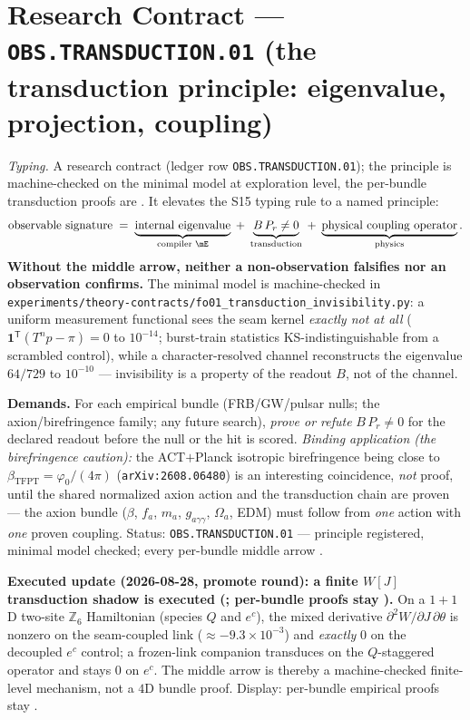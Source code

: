 \section*{Research Contract --- \texttt{OBS.TRANSDUCTION.01} (the transduction principle: eigenvalue, projection, coupling)}
\noindent\emph{Typing.} A research contract (ledger row \texttt{OBS.TRANSDUCTION.01}); the
principle is machine-checked on the minimal model at exploration level, the per-bundle
transduction proofs are \mO.  It elevates the S15 typing rule to a named principle:
\[
  \text{observable signature}
  \;=\;
  \underbrace{\text{internal eigenvalue}}_{\text{compiler \mE}}
  \;+\;
  \underbrace{B\,P_r\neq0}_{\text{transduction}}
  \;+\;
  \underbrace{\text{physical coupling operator}}_{\text{physics}} .
\]
\textbf{Without the middle arrow, neither a non-observation falsifies nor an observation
confirms.}  The minimal model is machine-checked in
\texttt{experiments/\allowbreak theory-contracts/\allowbreak fo01\_transduction\_invisibility.py}: a uniform measurement
functional sees the seam kernel \emph{exactly not at all} ($\mathbf1^{\mathsf T}(T^np-\pi)=0$ to
$10^{-14}$; burst-train statistics KS-indistinguishable from a scrambled control), while a
character-resolved channel reconstructs the eigenvalue $64/729$ to $10^{-10}$ --- invisibility
is a property of the readout $B$, not of the channel.

\par\smallskip\noindent\textbf{Demands.}  For each empirical bundle (FRB/GW/pulsar nulls; the
axion/birefringence family; any future search), \emph{prove or refute} $B\,P_r\neq0$ for the
declared readout before the null or the hit is scored.  \emph{Binding application (the
birefringence caution):} the ACT$+$Planck isotropic birefringence being close to
$\beta_{\mathrm{TFPT}}=\varphi_0/(4\pi)$ (\texttt{arXiv:2608.06480}) is an interesting
coincidence, \emph{not} proof, until the shared normalized axion action and the transduction
chain are proven --- the axion bundle ($\beta$, $f_a$, $m_a$, $g_{a\gamma\gamma}$, $\Omega_a$,
EDM) must follow from \emph{one} action with \emph{one} proven coupling.  Status:
\texttt{OBS.TRANSDUCTION.01} --- principle registered, minimal model checked; every per-bundle
middle arrow \mO.

\par\smallskip\noindent\textbf{Executed update (2026-08-28, promote round): a finite $W[J]$
transduction shadow is executed
(; per-bundle
proofs stay \mO).}
On a $1{+}1$D two-site $\mathbb Z_6$ Hamiltonian (species $Q$ and $e^c$), the mixed derivative
$\partial^2 W/\partial J\,\partial\theta$ is nonzero on the seam-coupled link
($\approx-9.3\times10^{-3}$) and \emph{exactly} $0$ on the decoupled $e^c$ control; a
frozen-link companion transduces on the $Q$-staggered operator and stays $0$ on $e^c$.
The middle arrow is thereby a machine-checked finite-level mechanism, not a $4$D bundle proof.
Display: per-bundle empirical proofs stay \mO.

